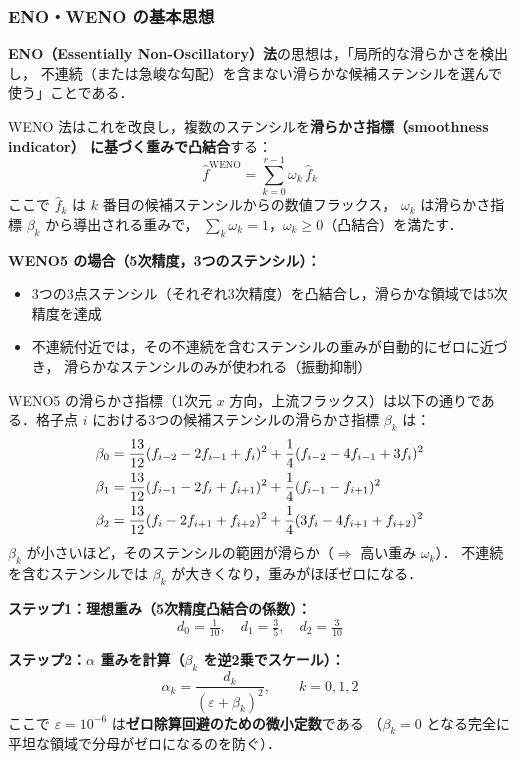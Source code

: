 \subsubsection{ENO・WENO の基本思想}

\textbf{ENO（Essentially Non-Oscillatory）法}の思想は，「局所的な滑らかさを検出し，
不連続（または急峻な勾配）を含まない滑らかな候補ステンシルを選んで使う」ことである．

WENO 法はこれを改良し，複数のステンシルを\textbf{滑らかさ指標（smoothness indicator）
に基づく重みで凸結合}する：
\begin{equation}
  \hat{f}^{\text{WENO}} = \sum_{k=0}^{r-1} \omega_k \, \hat{f}_k
  \label{eq:weno_convex}
\end{equation}
ここで $\hat{f}_k$ は $k$ 番目の候補ステンシルからの数値フラックス，
$\omega_k$ は滑らかさ指標 $\beta_k$ から導出される重みで，
$\sum_k \omega_k = 1$，$\omega_k \ge 0$（凸結合）を満たす．

\textbf{WENO5 の場合（5次精度，3つのステンシル）：}
\begin{itemize}
  \item 3つの3点ステンシル（それぞれ3次精度）を凸結合し，滑らかな領域では5次精度を達成
  \item 不連続付近では，その不連続を含むステンシルの重みが自動的にゼロに近づき，
        滑らかなステンシルのみが使われる（振動抑制）
\end{itemize}

WENO5 の滑らかさ指標（1次元 $x$ 方向，上流フラックス）は以下の通りである．格子点 $i$ における3つの候補ステンシルの滑らかさ指標 $\beta_k$ は：
\begin{align}
  \beta_0 &= \frac{13}{12}(f_{i-2}-2f_{i-1}+f_i)^2 + \frac{1}{4}(f_{i-2}-4f_{i-1}+3f_i)^2 \notag\\
  \beta_1 &= \frac{13}{12}(f_{i-1}-2f_i+f_{i+1})^2 + \frac{1}{4}(f_{i-1}-f_{i+1})^2 \notag\\
  \beta_2 &= \frac{13}{12}(f_i-2f_{i+1}+f_{i+2})^2 + \frac{1}{4}(3f_i-4f_{i+1}+f_{i+2})^2
  \label{eq:weno5_beta}
\end{align}
$\beta_k$ が小さいほど，そのステンシルの範囲が滑らか（$\Rightarrow$ 高い重み $\omega_k$）．
不連続を含むステンシルでは $\beta_k$ が大きくなり，重みがほぼゼロになる．

\textbf{ステップ1：理想重み（5次精度凸結合の係数）：}
\[
  d_0 = \tfrac{1}{10},\quad d_1 = \tfrac{3}{5},\quad d_2 = \tfrac{3}{10}
\]

\textbf{ステップ2：$\alpha$ 重みを計算（$\beta_k$ を逆2乗でスケール）：}
\[
  \alpha_k = \frac{d_k}{(\varepsilon + \beta_k)^2}, \qquad k = 0,1,2
\]
ここで $\varepsilon = 10^{-6}$ は\textbf{ゼロ除算回避のための微小定数}である
（$\beta_k = 0$ となる完全に平坦な領域で分母がゼロになるのを防ぐ）．

